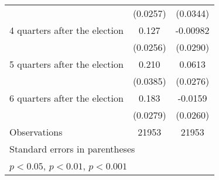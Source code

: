 \begin{table}[htbp]
\begin{tabular}{l*{2}{c}}
                    &    (0.0257)         &    (0.0344)         \\
[1em]
 4 quarters after the election&       0.127\sym{***}&    -0.00982         \\
                    &    (0.0256)         &    (0.0290)         \\
[1em]
 5 quarters after the election&       0.210\sym{***}&      0.0613\sym{*}  \\
                    &    (0.0385)         &    (0.0276)         \\
[1em]
 6 quarters after the election&       0.183\sym{***}&     -0.0159         \\
                    &    (0.0279)         &    (0.0260)         \\
\hline
Observations        &       21953         &       21953         \\
\hline\hline
\multicolumn{3}{l}{\footnotesize Standard errors in parentheses}\\
\multicolumn{3}{l}{\footnotesize \sym{*} \(p<0.05\), \sym{**} \(p<0.01\), \sym{***} \(p<0.001\)}\\
\end{tabular}
\end{table}
